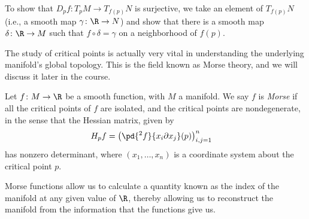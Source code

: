 \documentclass[10pt]{mypackage}
\begin{document}
\begin{remark}
  To show that $D_pf\colon T_pM\rightarrow T_{f(p)}N$ is surjective, we take an element of $T_{f(p)}N$ (i.e., a smooth map $\gamma\colon \R\rightarrow N$) and show that there is a smooth map $\delta\colon \R\rightarrow M$ such that $ f\circ \delta = \gamma $ on a neighborhood of $f(p)$.
\end{remark}
The study of critical points is actually very vital in understanding the underlying manifold's global topology. This is the field known as Morse theory, and we will discuss it later in the course.
\begin{definition}
  Let $f\colon M\rightarrow \R$ be a smooth function, with $M$ a manifold. We say $f$ is \textit{Morse} if all the critical points of $f$ are isolated, and the critical points are nondegenerate, in the sense that the Hessian matrix, given by
  \begin{align*}
    H_pf &= \left( \pd{^2f}{x_i\partial x_j}(p) \right)_{i,j=1}^{n}
  \end{align*}
  has nonzero determinant, where $\left( x_1,\dots,x_n \right)$ is a coordinate system about the critical point $p$.
\end{definition}
Morse functions allow us to calculate a quantity known as the index of the manifold at any given value of $\R$, thereby allowing us to reconstruct the manifold from the information that the functions give us.\newline
\end{document}
